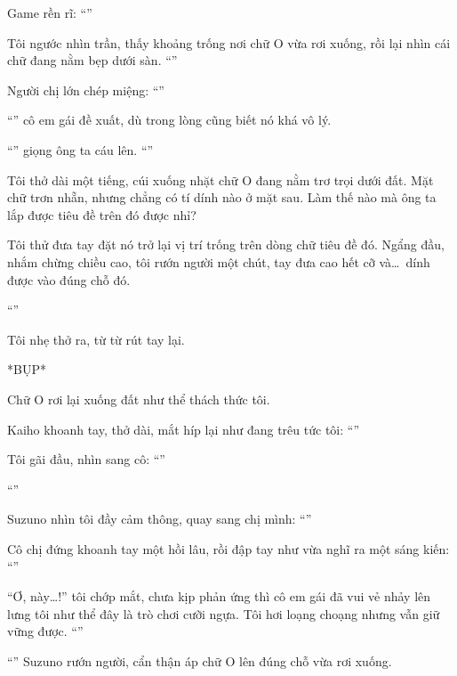 \documentclass[../main.tex]{subfiles}
\begin{document}
Game rền rĩ: ``''

Tôi ngước nhìn trần, thấy khoảng trống nơi chữ O vừa rơi xuống, rồi lại nhìn cái chữ đang nằm bẹp dưới sàn. ``''

Người chị lớn chép miệng: ``''

``'' cô em gái đề xuất, dù trong lòng cũng biết nó khá vô lý.

``'' giọng ông ta cáu lên. ``''

Tôi thở dài một tiếng, cúi xuống nhặt chữ O đang nằm trơ trọi dưới đất. Mặt chữ trơn nhẵn, nhưng chẳng có tí dính nào ở mặt sau. Làm thế nào mà ông ta lắp được tiêu đề trên đó được nhỉ?

Tôi thử đưa tay đặt nó trở lại vị trí trống trên dòng chữ tiêu đề đó. Ngẩng đầu, nhắm chừng chiều cao, tôi rướn người một chút, tay đưa cao hết cỡ và\dots\ dính được vào đúng chỗ đó.

``''

Tôi nhẹ thở ra, từ từ rút tay lại.

*BỤP*

Chữ O rơi lại xuống đất như thể thách thức tôi.

Kaiho khoanh tay, thở dài, mắt híp lại như đang trêu tức tôi: ``''

Tôi gãi đầu, nhìn sang cô: ``''

``''

Suzuno nhìn tôi đầy cảm thông, quay sang chị mình: ``''

Cô chị đứng khoanh tay một hồi lâu, rồi đập tay như vừa nghĩ ra một sáng kiến: ``''

``Ơ, này\dots!'' tôi chớp mắt, chưa kịp phản ứng thì cô em gái đã vui vẻ nhảy lên lưng tôi như thể đây là trò chơi cưỡi ngựa. Tôi hơi loạng choạng nhưng vẫn giữ vững được. ``''

``'' Suzuno rướn người, cẩn thận áp chữ O lên đúng chỗ vừa rơi xuống.
\end{document}
